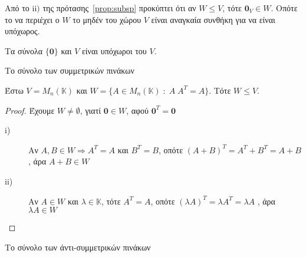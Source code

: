 \begin{rem}
\item {}
    Από το $ \mathrm{ii)} $ της πρότασης~\ref{prop:subsp} προκύπτει ότι αν $ W \leq V $,
    τότε $ \mathbf{0}_{V} \in W $. Οπότε το να περιέχει ο $ W $ το μηδέν του χώρου 
    $V$ είναι αναγκαία συνθήκη για να είναι υπόχωρος.
\end{rem}

\begin{prop}
    Τα σύνολα $ \{ \mathbf{0} \} $ και $V$ είναι υπόχωροι του $V$.
\end{prop}

\begin{examples}
\item {}
    \begin{enumerate}
        \item \textcolor{Col2}{Το σύνολο των συμμετρικών πινάκων}

            Έστω $ V = M_{n}(\mathbb{K}) $ και $ W = \{ A \in M_{n}(\mathbb{K}) \;
            : \; A \; A^{T}=A \}  $. Τότε $ W \leq V $.
            \begin{proof}
            \item {}
                Έχουμε $ W \neq \emptyset $, γιατί $ \mathbf{0} \in W $, αφού 
                $ \mathbf{0}^{T}= \mathbf{0} $
                \begin{description}
                    \item [i)]
                        Αν $ A, B \in W \Rightarrow A^{T}=A $ και $ B^{T}=B $, οπότε
                        $ (A+B)^{T}= A^{T}+B^{T}=A+B $, άρα $A+B \in W$
                    \item[ii)] Αν $ A \in W $ και $ \lambda \in \mathbb{K} $, τότε 
                        $A^{T}=A$, οπότε $(\lambda A)^{T} = \lambda A^{T} = \lambda A  $
                        , άρα $ \lambda A \in W $
                \end{description}
            \end{proof}

        \item \textcolor{Col2}{Το σύνολο των άντι-συμμετρικών πινάκων}


\end{enumerate}
\end{examples}
